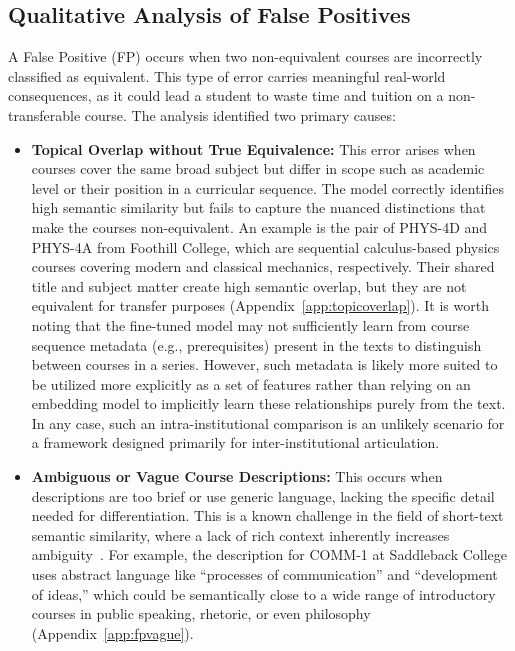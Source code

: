 \subsection{Qualitative Analysis of False Positives}\label{ch:4.6.2}
A False Positive (FP) occurs when two non-equivalent courses are incorrectly classified as equivalent. This type of error carries meaningful real-world consequences, as it could lead a student to waste time and tuition on a non-transferable course. The analysis identified two primary causes:
\begin{itemize}
    \item \textbf{Topical Overlap without True Equivalence:} This error arises when courses cover the same broad subject but differ in scope such as academic level or their position in a curricular sequence. The model correctly identifies high semantic similarity but fails to capture the nuanced distinctions that make the courses non-equivalent. An example is the pair of PHYS-4D and PHYS-4A from Foothill College, which are sequential calculus-based physics courses covering modern and classical mechanics, respectively. Their shared title and subject matter create high semantic overlap, but they are not equivalent for transfer purposes (Appendix~\ref{app:topicoverlap}).  It is worth noting that the fine-tuned model may not sufficiently learn from course sequence metadata (e.g., prerequisites) present in the texts to distinguish between courses in a series.  However, such metadata is likely more suited to be utilized more explicitly as a set of features rather than relying on an embedding model to implicitly learn these relationships purely from the text.  In any case, such an intra-institutional comparison is an unlikely scenario for a framework designed primarily for inter-institutional articulation.
    \item \textbf{Ambiguous or Vague Course Descriptions:} This occurs when descriptions are too brief or use generic language, lacking the specific detail needed for differentiation. This is a known challenge in the field of short-text semantic similarity, where a lack of rich context inherently increases ambiguity~\cite{app13063911}. For example, the description for COMM-1 at Saddleback College uses abstract language like ``processes of communication'' and ``development of ideas,'' which could be semantically close to a wide range of introductory courses in public speaking, rhetoric, or even philosophy (Appendix~\ref{app:fpvague}).
\end{itemize}

